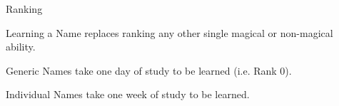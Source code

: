 \begin{Chapter}{Ranking}
\begin{Itemize}
  
\item Learning a Name replaces ranking any other single magical or
  non-magical ability.

\item Generic Names take one day of study to be learned (i.e. Rank 0).

\item Individual Names take one week of study to be learned.

\end{Itemize}

\end{Chapter}
